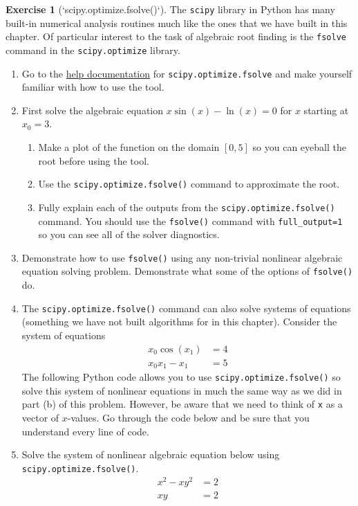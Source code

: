 \documentclass[
]{book}
\providecommand{\tightlist}{%
  \setlength{\itemsep}{0pt}\setlength{\parskip}{0pt}}
\theoremstyle{definition}
\theoremstyle{definition}
\theoremstyle{definition}
\newtheorem{exercise}{Exercise}[chapter]
\theoremstyle{remark}
\begin{document}
\begin{exercise}[`scipy.optimize.fsolve()`]
\protect\hypertarget{exr:fsolve}{}{\label{exr:fsolve} {} }The \texttt{scipy} library in Python has many built-in numerical analysis routines much like the ones that we have built in this chapter. Of particular interest to the task of algebraic root finding is the \texttt{fsolve} command in the \texttt{scipy.optimize} library.

\begin{enumerate}
\def\labelenumi{\alph{enumi}.}
\tightlist
\item
  Go to the \href{https://docs.scipy.org/doc/scipy/reference/generated/scipy.optimize.fsolve.html}{help documentation} for \texttt{scipy.optimize.fsolve} and make yourself familiar with how to use the tool.
\item
  First solve the algebraic equation \(x\sin(x) - \ln(x) = 0\) for \(x\) starting at \(x_0 = 3\).

  \begin{enumerate}
  \def\labelenumii{\roman{enumii}.}
  \tightlist
  \item
    Make a plot of the function on the domain \([0,5]\) so you can eyeball the root before using the tool.
  \item
    Use the \texttt{scipy.optimize.fsolve()} command to approximate the root.
  \item
    Fully explain each of the outputs from the \texttt{scipy.optimize.fsolve()} command. You should use the \texttt{fsolve()} command with \texttt{full\_output=1} so you can see all of the solver diagnostics.
  \end{enumerate}
\item
  Demonstrate how to use \texttt{fsolve()} using any non-trivial nonlinear algebraic equation solving problem. Demonstrate what some of the options of \texttt{fsolve()} do.
\item
  The \texttt{scipy.optimize.fsolve()} command can also solve systems of equations (something we have not built algorithms for in this chapter). Consider the system of equations
  \[ \begin{aligned} x_0 \cos(x_1) &= 4 \\ x_0 x_1 - x_1 &= 5  \end{aligned} \]
  The following Python code allows you to use \texttt{scipy.optimize.fsolve()} so solve this system of nonlinear equations in much the same way as we did in part (b) of this problem. However, be aware that we need to think of \texttt{x} as a vector of \(x\)-values. Go through the code below and be sure that you understand every line of code.
\item
  Solve the system of nonlinear algebraic equation below using \texttt{scipy.optimize.fsolve()}.
  \[ \begin{aligned} x^2-xy^2 &=2 \\ xy &= 2 \end{aligned} \]
\end{enumerate}
\end{exercise}
\end{document}
